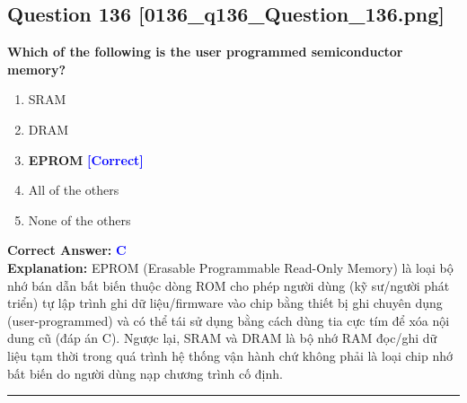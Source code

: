 \documentclass[11pt,a4paper]{article}
\begin{document}
\begin{minipage}{\textwidth}
\subsection*{Question 136 \quad \footnotesize{[0136\_q136\_Question\_136.png]}}
\noindent \textbf{Which of the following is the user programmed semiconductor memory?}

\begin{enumerate}[label=\Alph*.]
    \item SRAM
    \item DRAM
    \item \textbf{EPROM} \hfill \textcolor{blue}{\textbf{[Correct]}}
    \item All of the others
    \item None of the others
\end{enumerate}

\noindent \textbf{Correct Answer:} \textcolor{blue}{\textbf{C}} \\[2pt]
\noindent \textbf{Explanation:} EPROM (Erasable Programmable Read-Only Memory) là loại bộ nhớ bán dẫn bất biến thuộc dòng ROM cho phép người dùng (kỹ sư/người phát triển) tự lập trình ghi dữ liệu/firmware vào chip bằng thiết bị ghi chuyên dụng (user-programmed) và có thể tái sử dụng bằng cách dùng tia cực tím để xóa nội dung cũ (đáp án C). Ngược lại, SRAM và DRAM là bộ nhớ RAM đọc/ghi dữ liệu tạm thời trong quá trình hệ thống vận hành chứ không phải là loại chip nhớ bất biến do người dùng nạp chương trình cố định.

\par\vspace{0.3cm}
\hrule
\vspace{0.3cm}
\end{minipage}
\end{document}
